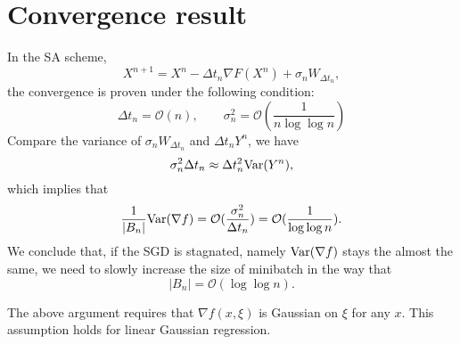 \section{Convergence result}
In the SA scheme, 
\begin{equation} \label{equ:SA}
X^{n+1} = X^n - \Delta t_n \nabla F(X^n) + \sigma_n W_{\Delta t_n},
\end{equation}
the convergence is proven under the following condition: 
$$ 
\Delta t_n = \mathcal{O}(n), \qquad \sigma_n^2 =
\mathcal{O}(\frac{1}{n \log\log n})
$$ 
Compare the variance of $\sigma_n W_{\Delta t_n}$ and $\Delta t_n
Y^n$, we have 
$$ 
\sigma_n^2 \Delta t_n \approx \Delta t_n^2 {\rm Var}(Y^n),
$$ 
which implies that 
$$ 
\frac{1}{|B_n|} {\rm Var}(\nabla f) =
\mathcal{O}(\frac{\sigma_n^2}{\Delta t_n}) =
\mathcal{O}(\frac{1}{\log\log n}).
$$ 
We conclude that, if the SGD is stagnated, namely ${\rm Var}(\nabla
f)$ stays the almost the same, we need to slowly increase the size of
minibatch in the way that 
\begin{equation} \label{equ:batch-size}
|B_n| = \mathcal{O}(\log\log n).
\end{equation}


\begin{remark}
The above argument requires that $\nabla f(x, \xi)$ is Gaussian on
$\xi$ for any $x$. This assumption holds for linear Gaussian
regression. 
\end{remark}



